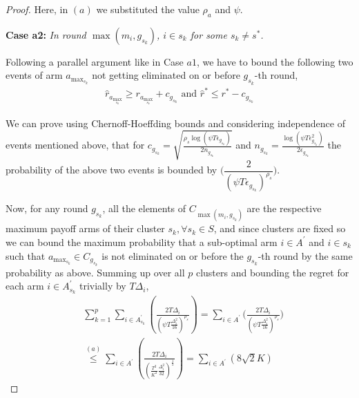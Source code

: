 \begin{proof}
  Here, in $(a)$ we substituted the value $\rho_a$ and $\psi$.




\textbf{Case a2:} \textit{In round $\max(m_{i},g_{s_{k}})$, ${i} \in s_k$ for some $s_k \ne s^{*}$.}

Following a parallel argument like in Case $a1$, we have to bound the following two events of arm $a_{\max_{s_{k}}}$ not getting eliminated on or before $g_{s_{k}}$-th round,
\begin{align*}
  \hat{r}_{a_{\max_{s_{k}}}} \geq r_{a_{\max_{s_{k}}}} +c_{g_{s_{k}}} \text{ and } \hat{r}^{*} \leq r^{*} - c_{g_{s_{k}}} 
\end{align*} 

We can prove using Chernoff-Hoeffding bounds and considering independence of events mentioned above, that for $c_{g_{s_{k}}}=\sqrt{\frac{\rho_{s} \log (\psi T\epsilon_{g_{s_{k}}})}{2 n_{g_{s_{k}}}}}$ and  $n_{g_{s_{k}}}=\frac{\log{(\psi T\epsilon_{g_{s_{k}}}^{2})}}{2\epsilon_{g_{s_{k}}}}$ the probability of the above two events is bounded by $\bigg(\dfrac{2}{(\psi  T\epsilon_{g_{s_{k}}})^{\rho_{s}}}\bigg)$.

  Now, for any round $g_{s_{k}}$, all the elements of $C_{\max(m_{i},g_{s_{k}})}$ are the respective maximum payoff arms of their cluster $s_{k}, \forall s_{k}\in S$, and since clusters are fixed so we can bound the maximum probability that a sub-optimal arm ${i}\in A^{'}$  and ${i}\in s_{k}$ such that $a_{\max_{s_{k}}}\in C_{g_{s_{k}}}$ is not eliminated on or before the $g_{s_{k}}$-th round by the same probability as above. Summing up over all $p$ clusters and bounding the regret for each arm $i\in A_{s_{k}}^{'}$ trivially by $T\Delta_{i}$,
 \begin{align*}
 &\sum_{k=1}^{p}\sum_{i\in A_{s_{k}}^{'}}\left(\frac{2T\Delta_{i}}{(\psi T\frac{\Delta_{i}^{2}}{16})^{\rho_{s}}}\right) = \sum_{i\in A^{'}}\bigg( \frac{2T\Delta_{i}}{(\psi  T\frac{\Delta_{i}^{2}}{16})^{\rho_{s}}} \bigg) \\
 & \overset{(a)}{\leq} \sum_{i\in A^{'}}\left(\frac{2T\Delta_{i}}{(\frac{T^2}{K^2}\frac{\Delta_{i}^{2}}{32})^{\frac{1}{2}}}\right) = \sum_{i\in A^{'}} \left( 8\sqrt{2}K \right)
 \end{align*}


\end{proof}
